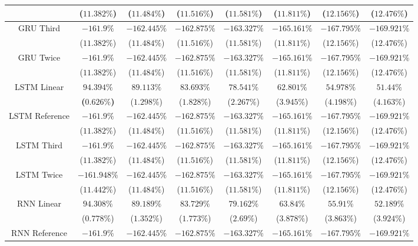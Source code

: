 \begin{table}[!ht]
{\begin{tabular}{|c|c|c|c|c|c|c|c|}
			 & ($11.382\%$) & ($11.484\%$) & ($11.516\%$) & ($11.581\%$) & ($11.811\%$) & ($12.156\%$) & ($12.476\%$) \\ \hline
			\multirow{2}{*}{GRU Third} & $-161.9\%$ & $-162.445\%$ & $-162.875\%$ & $-163.327\%$ & $-165.161\%$ & $-167.795\%$ & $-169.921\%$ \\
			 & ($11.382\%$) & ($11.484\%$) & ($11.516\%$) & ($11.581\%$) & ($11.811\%$) & ($12.156\%$) & ($12.476\%$) \\ \hline
			\multirow{2}{*}{GRU Twice} & $-161.9\%$ & $-162.445\%$ & $-162.875\%$ & $-163.327\%$ & $-165.161\%$ & $-167.795\%$ & $-169.921\%$ \\
			 & ($11.382\%$) & ($11.484\%$) & ($11.516\%$) & ($11.581\%$) & ($11.811\%$) & ($12.156\%$) & ($12.476\%$) \\ \hline
			\multirow{2}{*}{LSTM Linear} & $\mathbf{94.394\%}$ & $89.113\%$ & $83.693\%$ & $78.541\%$ & $62.801\%$ & $54.978\%$ & $51.44\%$ \\
			 & \textbf{(}$\mathbf{0.626\%}$\textbf{)} & ($1.298\%$) & ($1.828\%$) & ($2.267\%$) & ($3.945\%$) & ($4.198\%$) & ($4.163\%$) \\ \hline
			\multirow{2}{*}{LSTM Reference} & $-161.9\%$ & $-162.445\%$ & $-162.875\%$ & $-163.327\%$ & $-165.161\%$ & $-167.795\%$ & $-169.921\%$ \\
			 & ($11.382\%$) & ($11.484\%$) & ($11.516\%$) & ($11.581\%$) & ($11.811\%$) & ($12.156\%$) & ($12.476\%$) \\ \hline
			\multirow{2}{*}{LSTM Third} & $-161.9\%$ & $-162.445\%$ & $-162.875\%$ & $-163.327\%$ & $-165.161\%$ & $-167.795\%$ & $-169.921\%$ \\
			 & ($11.382\%$) & ($11.484\%$) & ($11.516\%$) & ($11.581\%$) & ($11.811\%$) & ($12.156\%$) & ($12.476\%$) \\ \hline
			\multirow{2}{*}{LSTM Twice} & $-161.948\%$ & $-162.445\%$ & $-162.875\%$ & $-163.327\%$ & $-165.161\%$ & $-167.795\%$ & $-169.921\%$ \\
			 & ($11.442\%$) & ($11.484\%$) & ($11.516\%$) & ($11.581\%$) & ($11.811\%$) & ($12.156\%$) & ($12.476\%$) \\ \hline
			\multirow{2}{*}{RNN Linear} & $94.308\%$ & $89.189\%$ & $83.729\%$ & $79.162\%$ & $63.84\%$ & $55.91\%$ & $52.189\%$ \\
			 & ($0.778\%$) & ($1.352\%$) & ($1.773\%$) & ($2.69\%$) & ($3.878\%$) & ($3.863\%$) & ($3.924\%$) \\ \hline
			\multirow{2}{*}{RNN Reference} & $-161.9\%$ & $-162.445\%$ & $-162.875\%$ & $-163.327\%$ & $-165.161\%$ & $-167.795\%$ & $-169.921\%$ \\

\end{tabular}}
\end{table}
